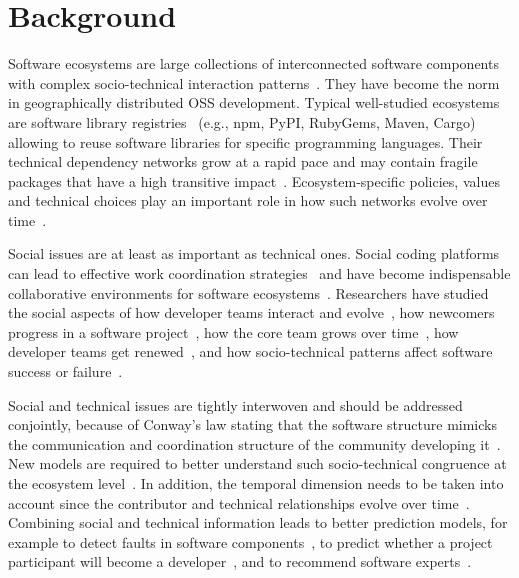 

\section{Background}

Software ecosystems are large collections of interconnected software components with complex socio-technical interaction patterns~\cite{Lungu2009,ManikasHansen2013}. They have become the norm in geographically distributed OSS  development. Typical well-studied ecosystems are software library registries~\cite{Decan2017SANER,Kikas2017,Dietrich2019} (e.g., npm, PyPI, RubyGems, Maven, Cargo) allowing to reuse software libraries for specific programming languages.
 Their technical dependency networks grow at a rapid pace and may contain fragile packages that have a high transitive impact~\cite{Decan2019EMSE}. Ecosystem-specific policies, values and technical choices play an important role in how such networks evolve over time~\cite{Bogart2016}.

Social issues are at least as important as technical ones. Social coding platforms can lead to effective work coordination strategies~\cite{DabbishSTH12} and have become indispensable collaborative environments for software ecosystems~\cite{Herbsleb1999}.
Researchers have studied the social aspects of how developer teams interact and evolve~\cite{lopezfernandez2006:sna}, how newcomers progress in a software project~\cite{Zhou2011-ICSE,Zhou2012-ICSE}, how the core team grows over time~\cite{Robles2009MSR}, how developer teams get renewed~\cite{Constantinou2017SANER}, and how socio-technical patterns affect software success or failure~\cite{SurianTLCL13}. 

Social and technical issues are tightly interwoven and should be addressed conjointly, because of Conway's law stating that the software structure mimicks the communication and coordination structure of the community developing it~\cite{Conway1968, Herbsleb1999, Kwan2011,Blincoe2019}. New models are required to better understand such socio-technical congruence at the ecosystem level~\cite{Palyart2018TSE}. In addition, the temporal dimension needs to be taken into account since the contributor and technical relationships evolve over time~\cite{Cataldo2008}.
Combining social and technical information leads to better prediction models, for example to detect faults in software components~\cite{Bird2009,Bhattacharya2012}, to predict whether a project participant will become a developer~\cite{Gharehyazie2013-ICSM}, and to recommend software experts~\cite{Kintab:2014:RSE:2735522.2735526}.

